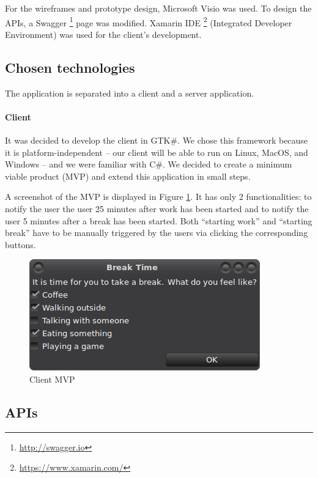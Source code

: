 For the wireframes and prototype design, Microsoft Visio was used. To design the APIs, a Swagger \footnote{\url{http://swagger.io}} page was modified. Xamarin IDE \footnote{\url{https://www.xamarin.com/}} (Integrated Developer Environment) was used for the client's development.

\subsection{Chosen technologies}
The application is separated into a client and a server application.



\paragraph{Client} It was decided to develop the client in GTK\#. We chose this framework because it is platform-independent -- our client will be able to run on Linux, MacOS, and Windows -- and we were familiar with C\#. We decided to create a minimum viable product (MVP) and extend this application in small steps. 

A screenshot of the MVP is displayed in Figure \ref{fig:mvp-screenshot}. It has only 2 functionalities: to notify the user the user 25 minutes after work has been started and to notify the user 5 minutes after a break has been started. Both ``starting work'' and ``starting break'' have to be manually triggered by the users via clicking the corresponding buttons.

\begin{figure}
  \centering
  \includegraphics{images/mvp-screenshot.png}
  \caption{Client MVP}
  \label{fig:mvp-screenshot}
\end{figure}



\subsection{APIs}

